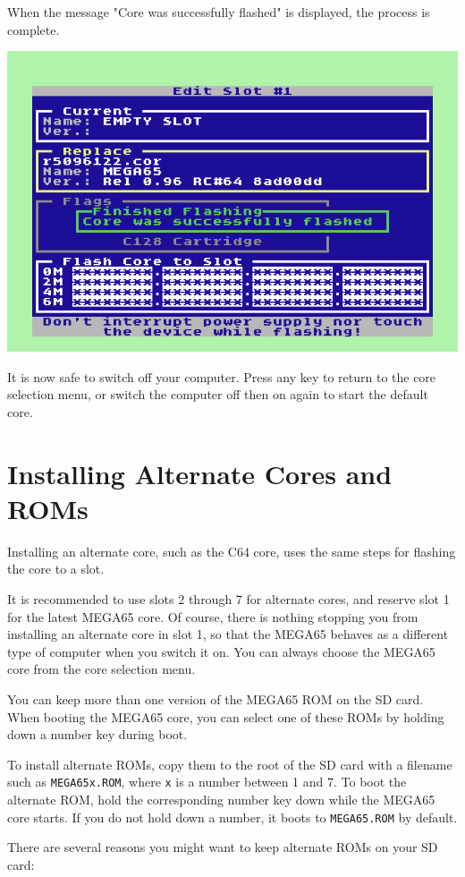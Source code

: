 When the message "Core was successfully flashed" is displayed, the process is complete.

\begin{center}
  \includegraphics[width=0.7\linewidth]{images/ss-flashmenu-complete.png}
\end{center}

It is now safe to switch off your computer. Press any key to return to the core selection menu, or switch the computer off then on again to start the default core.


\section{Installing Alternate Cores and ROMs}

Installing an alternate core, such as the C64 core, uses the same steps for flashing the core to a slot.

It is recommended to use slots 2 through 7 for alternate cores, and reserve slot 1 for the latest MEGA65 core. Of course, there is nothing stopping you from installing an alternate core in slot 1, so that the MEGA65 behaves as a different type of computer when you switch it on. You can always choose the MEGA65 core from the core selection menu.

You can keep more than one version of the MEGA65 ROM on the SD card. When booting the MEGA65 core, you can select one of these ROMs by holding down a number key during boot.

To install alternate ROMs, copy them to the root of the SD card with a filename such as {\tt MEGA65x.ROM}, where {\tt x} is a number between 1 and 7. To boot the alternate ROM, hold the corresponding number key down while the MEGA65 core starts. If you do not hold down a number, it boots to {\tt MEGA65.ROM} by default.

There are several reasons you might want to keep alternate ROMs on your SD card:


